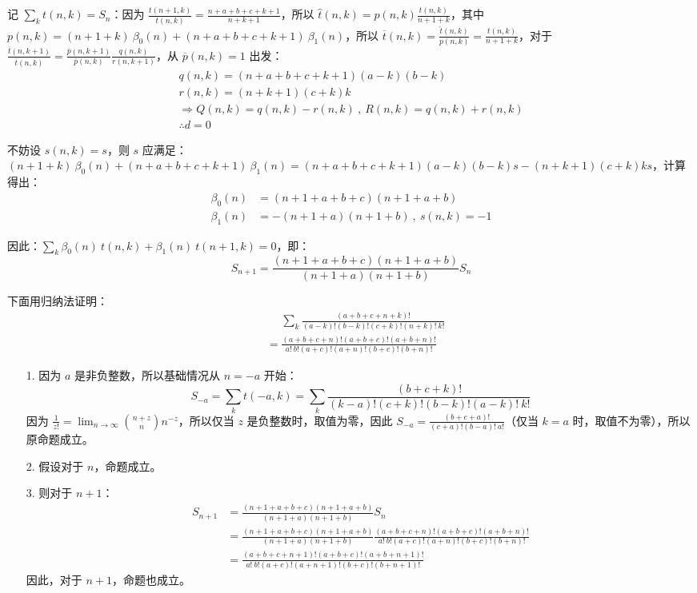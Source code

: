 记 \( \sum_k t(n,k) = S_n \)：因为 \( \frac{t(n+1,k)}{t(n,k)} = \frac{n+a+b+c+k+1}{n+k+1} \)，所以 \( \hat{t}(n,k) = p(n,k) \frac{t(n,k)}{n+1+k} \)，其中 \( p(n,k) = (n+1+k) \ \beta_0(n) + (n+a+b+c+k+1) \ \beta_1(n) \)，所以 \( \overline{t}(n,k) = \frac{\hat{t}(n,k)}{p(n,k)} = \frac{t(n,k)}{n+1+k} \)，对于 \( \frac{\overline{t}(n,k+1)}{\overline{t}(n,k)} = \frac{\overline{p}(n,k+1)}{\overline{p}(n,k)} \frac{q(n,k)}{r(n,k+1)} \)，从 \( \overline{p}(n,k) = 1 \) 出发：
\begin{gather*}
  q(n,k) = (n+a+b+c+k+1)(a-k)(b-k) \\ r(n,k) = (n+k+1)(c+k)k \\
  \Rightarrow Q(n,k) = q(n,k) - r(n,k) \ , \ R(n,k) = q(n,k) + r(n,k) \\
  \therefore d = 0
\end{gather*}

不妨设 \( s(n,k) = s \)，则 \( s \) 应满足：\( (n+1+k) \ \beta_0(n) + (n+a+b+c+k+1) \ \beta_1(n) = (n+a+b+c+k+1)(a-k)(b-k) s - (n+k+1)(c+k)ks \)，计算得出：
\begin{align*}
  \beta_0(n) &= (n+1+a+b+c)(n+1+a+b) \\
  \beta_1(n) &= -(n+1+a)(n+1+b) \ , \ s(n,k) = -1
\end{align*}

因此：\( \sum_k \beta_0(n) \ t(n,k) + \beta_1(n) \ t(n+1,k) = 0 \)，即：
\[
  S_{n+1} = \frac{(n+1+a+b+c)(n+1+a+b)}{(n+1+a)(n+1+b)} S_n
\]

下面用归纳法证明：
\begin{align*}
  &\phantom{=} \sum_k \frac{(a+b+c+n+k)!}{(a-k)! (b-k)! (c+k)! (n+k)! \ k!} \\
  &= \frac{(a+b+c+n)! (a+b+c)! (a+b+n)!}{a! \ b! (a+c)! (a+n)! (b+c)! (b+n)!}
\end{align*}

\begin{enumerate}
  \item[1.] 因为 \( a \) 是非负整数，所以基础情况从 \( n=-a \) 开始：
    \[
      S_{-a} = \sum_k t(-a,k) = \sum_k \frac{(b+c+k)!}{(k-a)! (c+k)! (b-k)! (a-k)! \ k!}
    \]
    因为 \( \frac{1}{z!} = \lim_{n \to \infty} \binom{n+z}{n} n^{-z} \)，所以仅当 \( z \) 是负整数时，取值为零，因此 \( S_{-a} = \frac{(b+c+a)!}{(c+a)! (b-a)! \ a!} \)（仅当 \( k = a \) 时，取值不为零），所以原命题成立。
  \item[2.] 假设对于 \( n \)，命题成立。
  \item[3.] 则对于 \( n+1 \)：
    \begin{align*}
      S_{n+1} &= \frac{(n+1+a+b+c)(n+1+a+b)}{(n+1+a)(n+1+b)} S_n \\
      &= \frac{(n+1+a+b+c)(n+1+a+b)}{(n+1+a)(n+1+b)} \frac{(a+b+c+n)! (a+b+c)! (a+b+n)!}{a! \ b! (a+c)! (a+n)! (b+c)! (b+n)!} \\
      &= \frac{(a+b+c+n+1)! (a+b+c)! (a+b+n+1)!}{a! \ b! (a+c)! (a+n+1)! (b+c)! (b+n+1)!}
    \end{align*}
    因此，对于 \( n+1 \)，命题也成立。
\end{enumerate}

